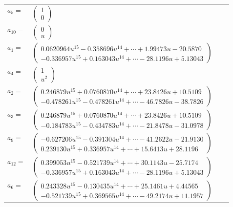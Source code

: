 \documentclass[1p]{elsarticle_modified}
\theoremstyle{definition}
\begin{document}
\begin{tabular}{m{7pt} m{180pt} m{7pt} m{180pt} }
\flushright $a_{5}=$&$\begin{pmatrix}1\\0\end{pmatrix}$ \\
\flushright $a_{10}=$&$\begin{pmatrix}0\\u\end{pmatrix}$ \\
\flushright $a_{1}=$&$\begin{pmatrix}0.0620964 u^{15}-0.358696 u^{14}+\cdots+1.99473 u-20.5870\\-0.336957 u^{15}+0.163043 u^{14}+\cdots-28.1196 u+5.13043\end{pmatrix}$ \\
\flushright $a_{4}=$&$\begin{pmatrix}1\\u^2\end{pmatrix}$ \\
\flushright $a_{2}=$&$\begin{pmatrix}0.246879 u^{15}+0.0760870 u^{14}+\cdots+23.8426 u+10.5109\\-0.478261 u^{15}-0.478261 u^{14}+\cdots-46.7826 u-38.7826\end{pmatrix}$ \\
\flushright $a_{3}=$&$\begin{pmatrix}0.246879 u^{15}+0.0760870 u^{14}+\cdots+23.8426 u+10.5109\\-0.184783 u^{15}-0.434783 u^{14}+\cdots-21.8478 u-31.0978\end{pmatrix}$ \\
\flushright $a_{9}=$&$\begin{pmatrix}-0.627206 u^{15}-0.391304 u^{14}+\cdots-41.2622 u-21.9130\\0.239130 u^{15}+0.336957 u^{14}+\cdots+15.6413 u+28.1196\end{pmatrix}$ \\
\flushright $a_{12}=$&$\begin{pmatrix}0.399053 u^{15}-0.521739 u^{14}+\cdots+30.1143 u-25.7174\\-0.336957 u^{15}+0.163043 u^{14}+\cdots-28.1196 u+5.13043\end{pmatrix}$ \\
\flushright $a_{6}=$&$\begin{pmatrix}0.243328 u^{15}-0.130435 u^{14}+\cdots+25.1461 u+4.44565\\-0.521739 u^{15}+0.369565 u^{14}+\cdots-49.2174 u+11.1957\end{pmatrix}$ \\

\end{tabular}
\end{document}
